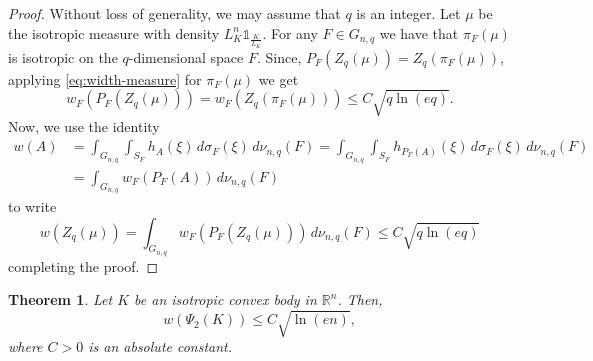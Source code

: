 \documentclass[10pt,a4paper]{amsart}
\newtheorem{theorem}{Theorem}[section]
\numberwithin{equation}{section}
\newcommand{\ls}{\leqslant}
\begin{document}
\begin{proof}Without loss of generality, we may assume that $q$ is an integer. Let $\mu$ be the isotropic measure with density $L_K^n\mathds{1}_{\frac{K}{L_K}}$.
For any $F\in G_{n,q}$ we have that $\pi_F(\mu)$ is isotropic on the $q$-dimensional space $F$. Since, $P_F(Z_q(\mu))=Z_q(\pi_F(\mu))$, applying \eqref{eq:width-measure}
for $\pi_F(\mu)$ we get
$$w_F(P_F(Z_q(\mu)))=w_F(Z_q(\pi_F(\mu)))\ls C\sqrt{q\ln(eq)}.$$
Now, we use the identity
\begin{align*}w(A) &=\int_{G_{n,q}}\int_{S_F}h_A(\xi)\,d\sigma_F(\xi)\,d\nu_{n,q}(F)=\int_{G_{n,q}}\int_{S_F}h_{P_F(A)}(\xi)\,d\sigma_F(\xi)\,d\nu_{n,q}(F)\\
&=\int_{G_{n,q}}w_F(P_F(A))\,d\nu_{n,q}(F)\end{align*}
to write
$$w(Z_q(\mu))=\int_{G_{n,q}}w_F(P_F(Z_q(\mu)))\,d\nu_{n,q}(F)\ls C\sqrt{q\ln(eq)}$$
completing the proof.
\end{proof}



\begin{theorem}\label{th:1.3}Let $K$ be an isotropic convex body in ${\mathbb{R}}^n$. Then,
\[w(\Psi_2(K))\ls C\sqrt{\ln(en)},\]
where $C>0$ is an absolute constant.
\end{theorem}
\end{document}
